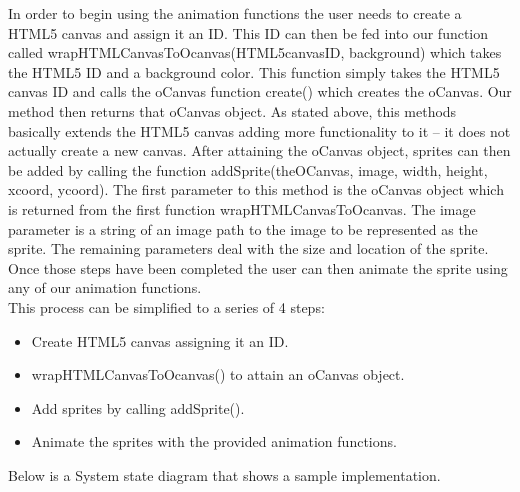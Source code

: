 \documentclass[12pt]{article}
\begin{document}
In order to begin using the animation functions the user needs to create a HTML5 canvas and assign it an ID. This ID can then be fed into our function called wrapHTMLCanvasToOcanvas(HTML5canvasID, background) which takes the HTML5 ID and a background color. This function simply takes the HTML5 canvas ID and calls the oCanvas function create() which creates the oCanvas. Our method then returns that oCanvas object. As stated above, this methods basically extends the HTML5 canvas adding more functionality to it -- it does not actually create a new canvas. After attaining the oCanvas object, sprites can then be added by calling the function addSprite(theOCanvas, image, width, height, xcoord, ycoord). The first parameter to this method is the oCanvas object which is returned from the first function wrapHTMLCanvasToOcanvas. The image parameter is a string of an image path to the image to be represented as the sprite. The remaining parameters deal with the size and location of the sprite. Once those steps have been completed the user can then animate the sprite using any of our animation functions. \\

This process can be simplified to a series of 4 steps:
\begin{itemize}
\item Create HTML5 canvas assigning it an ID.
\item wrapHTMLCanvasToOcanvas() to attain an oCanvas object.
\item Add sprites by calling addSprite().
\item Animate the sprites with the provided animation functions.\\
\end{itemize}

Below is a System state diagram that shows a sample implementation.\\
\end{document}
